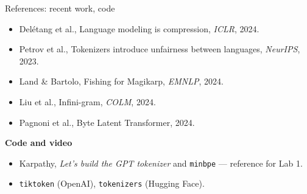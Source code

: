 \documentclass[11pt,aspectratio=169]{beamer}
\begin{document}
\begin{frame}{References: recent work, code}
  \small
  \begin{itemize}
    \item Delétang et al., Language modeling is compression, \emph{ICLR}, 2024.
    \item Petrov et al., Tokenizers introduce unfairness between languages, \emph{NeurIPS}, 2023.
    \item Land \& Bartolo, Fishing for Magikarp, \emph{EMNLP}, 2024.
    \item Liu et al., Infini-gram, \emph{COLM}, 2024.
    \item Pagnoni et al., Byte Latent Transformer, 2024.
  \end{itemize}

  \vspace{1em}
  \textbf{Code and video}
  \begin{itemize}
    \item Karpathy, \emph{Let's build the GPT tokenizer} and \texttt{minbpe} --- reference for
          Lab 1.
    \item \texttt{tiktoken} (OpenAI), \texttt{tokenizers} (Hugging Face).
  \end{itemize}
\end{frame}
\end{document}
